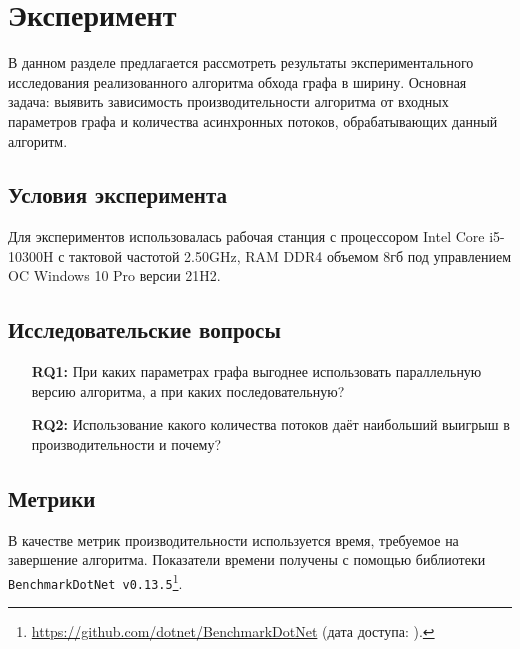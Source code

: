 
\section{Эксперимент}

В данном разделе предлагается рассмотреть результаты экспериментального исследования реализованного алгоритма обхода графа в ширину. Основная задача: выявить зависимость производительности алгоритма от входных параметров графа и количества асинхронных потоков, обрабатывающих данный алгоритм.

\subsection{Условия эксперимента}
Для экспериментов использовалась рабочая станция с процессором Intel Core i5-10300H с тактовой частотой 2.50GHz, RAM DDR4 объемом 8гб под управлением OC Windows 10 Pro версии 21H2.

\subsection{Исследовательские вопросы }

\begin{itemize}
\item[\textbf{RQ1:}] При каких параметрах графа выгоднее использовать параллельную версию алгоритма, а при каких последовательную?
\item[\textbf{RQ2:}] Использование какого количества потоков даёт наибольший выигрыш в производительности и почему?
\end{itemize}


\subsection{Метрики}
В качестве метрик производительности используется время, требуемое на завершение алгоритма. Показатели времени получены с помощью библиотеки \texttt{BenchmarkDotNet v0.13.5}\footnote{\url{https://github.com/dotnet/BenchmarkDotNet} (дата доступа:   ).}.

